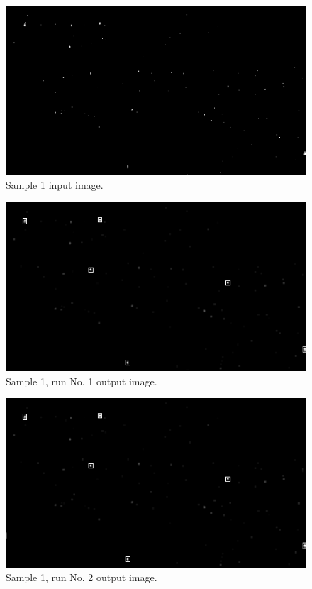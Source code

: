 \documentclass[12pt]{report}
\begin{document}
\begin{figure}[!h]
    \centering
    \includegraphics[scale=0.7]{results/s0_in.png}
    \caption{Sample 1 input image.}
    \label{res:s0_in}
\end{figure}
\begin{figure}[!h]
    \centering
    \includegraphics[scale=1.2]{results/s0_1.png}
    \caption{Sample 1, run No. 1 output image.}
    \label{res:s0_1}
\end{figure}
\begin{figure}[!h]
    \centering
    \includegraphics[scale=1.2]{results/s0_2.png}
    \caption{Sample 1, run No. 2 output image.}
    \label{res:s0_2}
\end{figure}
\end{document}
